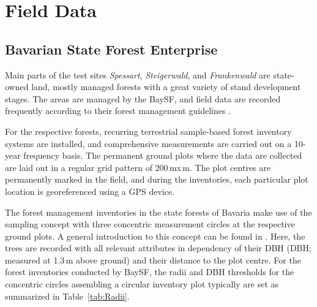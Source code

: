 \section{Field Data}\label{sec:FieldData}

\subsection{Bavarian State Forest Enterprise}\label{subsec:FieldData_BaySF}

Main parts of the test sites \emph{Spessart}, \emph{Steigerwald}, 
and \emph{Frankenwald} are state-owned land, 
mostly managed forests with a great variety of stand development stages. The areas are managed by the 
\ac{BaySF}, and field data are recorded frequently according to their forest management guidelines \parencite{Neufanger.2011}.

For the respective forests,  
recurring terrestrial sample-based forest inventory systems are installed, and 
comprehensive measurements are carried out on a 10-year frequency basis.
The permanent ground plots where the data are collected are laid out in a regular grid pattern of 200\,m\;x\,m.
The plot centres are permanently marked in the field, and during the inventories, each particular plot location is georeferenced 
using a GPS device. 

The forest management inventories  
in the state forests of Bavaria make use of the sampling concept with three concentric measurement circles
at the respective ground plots. A general introduction to this concept can be found in \textcite{vanLaar.2007}. Here, the trees are recorded with 
all relevant attributes in dependency of their \acl{DBH} (\acs{DBH}; measured at 1.3\,m above ground) and their distance to the plot centre.
For the forest inventories conducted by \ac{BaySF}, the radii and \acs{DBH} thresholds for the concentric circles 
assembling a circular inventory plot typically are set as summarized in Table~\ref{tab:Radii}.

